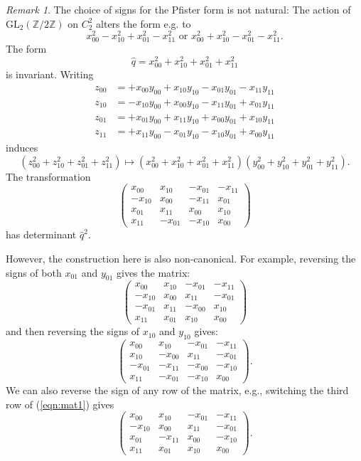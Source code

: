 \documentclass[12pt]{amsart}
\numberwithin{equation}{section}
\newcommand{\bZ}{\mathbb{Z}}
\newcommand{\GL}{\mathrm{GL}}
\theoremstyle{plain}
\theoremstyle{definition}
\theoremstyle{remark}
\newtheorem{rema}[prop]{Remark}
\begin{document}
\begin{rema}
The choice of signs for the Pfister form is not natural:
The action of $\GL_2(\bZ/2\bZ)$ on $C_2^2$ alters the form e.g. to
$$x_{00}^2 - x_{10}^2 + x_{01}^2 -x_{11}^2 \text{ or }
x_{00}^2 + x_{10}^2 - x_{01}^2 -x_{11}^2.$$
The form 
$$\hat{q}=x_{00}^2 + x_{10}^2 + x_{01}^2 + x_{11}^2$$
is invariant.  
Writing 
\begin{align*}
z_{00} &= +x_{00}y_{00}+x_{10}y_{10}-x_{01}y_{01}-x_{11}y_{11}\\
z_{10} &= -x_{10}y_{00}+x_{00}y_{10} -x_{11}y_{01}+x_{01}y_{11}\\
z_{01} &= +x_{01}y_{00} +x_{11}y_{10} + x_{00}y_{01} + x_{10}y_{11} \\
z_{11} &= +x_{11}y_{00} - x_{01}y_{10} - x_{10}y_{01} + x_{00} y_{11}
\end{align*}
induces
$$(z_{00}^2+z_{10}^2+z_{01}^2+z_{11}^2) \mapsto
(x_{00}^2+x_{10}^2+x_{01}^2+x_{11}^2) 
(y_{00}^2+y_{10}^2+y_{01}^2+y_{11}^2).$$ 
The transformation 
$$\left( \begin{matrix}
x_{00} &x_{10} &-x_{01}&-x_{11}\\
-x_{10}&x_{00}&-x_{11}&x_{01}\\
x_{01}&x_{11}&x_{00}&x_{10}\\
x_{11}&-x_{01}&-x_{10}&x_{00}
\end{matrix} \right)$$
has determinant $\hat{q}^2$.

However, the construction here is also non-canonical. For example,
reversing the signs of both $x_{01}$ and $y_{01}$ gives the
matrix:
\begin{equation} \label{eqn:mat1}
\left( \begin{matrix}
x_{00} &x_{10} &-x_{01}&-x_{11}\\
-x_{10}&x_{00}&x_{11}&-x_{01}\\
-x_{01}&x_{11}&-x_{00}&x_{10}\\
x_{11}&x_{01}&x_{10}&x_{00}
\end{matrix} \right)
\end{equation}
and then reversing the signs of $x_{10}$ and $y_{10}$ gives:
$$\left( \begin{matrix}
x_{00} &x_{10} &-x_{01}&-x_{11}\\
x_{10}&-x_{00}&x_{11}&-x_{01}\\
-x_{01}&-x_{11}&-x_{00}&-x_{10}\\
x_{11}&-x_{01}&-x_{10}&x_{00}
\end{matrix} \right).$$
We can also reverse the sign of any row of the matrix,
e.g., switching the third row of (\ref{eqn:mat1}) gives
$$
\left( \begin{matrix}
x_{00} &x_{10} &-x_{01}&-x_{11}\\
-x_{10}&x_{00}&x_{11}&-x_{01}\\
x_{01}&-x_{11}&x_{00}&-x_{10}\\
x_{11}&x_{01}&x_{10}&x_{00}
\end{matrix} \right).
$$
\end{rema}
\end{document}
